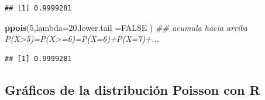 \documentclass[]{book}
\newenvironment{Shaded}{\begin{snugshade}}{\end{snugshade}}
\newcommand{\CommentTok}[1]{\textcolor[rgb]{0.56,0.35,0.01}{\textit{#1}}}
\newcommand{\DataTypeTok}[1]{\textcolor[rgb]{0.13,0.29,0.53}{#1}}
\newcommand{\DecValTok}[1]{\textcolor[rgb]{0.00,0.00,0.81}{#1}}
\newcommand{\KeywordTok}[1]{\textcolor[rgb]{0.13,0.29,0.53}{\textbf{#1}}}
\newcommand{\NormalTok}[1]{#1}
\newcommand{\OtherTok}[1]{\textcolor[rgb]{0.56,0.35,0.01}{#1}}
\begin{document}
\begin{verbatim}
## [1] 0.9999281
\end{verbatim}

\begin{Shaded}
\begin{Highlighting}[]
\KeywordTok{ppois}\NormalTok{(}\DecValTok{5}\NormalTok{,}\DataTypeTok{lambda=}\DecValTok{20}\NormalTok{,}\DataTypeTok{lower.tail =}\OtherTok{FALSE}\NormalTok{ ) }\CommentTok{## acumula hacia arriba P(X>5)=P(X>=6)=P(X=6)+P(X=7)+...}
\end{Highlighting}
\end{Shaded}

\begin{verbatim}
## [1] 0.9999281
\end{verbatim}

\hypertarget{gruxe1ficos-de-la-distribuciuxf3n-poisson-con-r}{%
\subsection{Gráficos de la distribución Poisson con R}\label{gruxe1ficos-de-la-distribuciuxf3n-poisson-con-r}}
\end{document}
